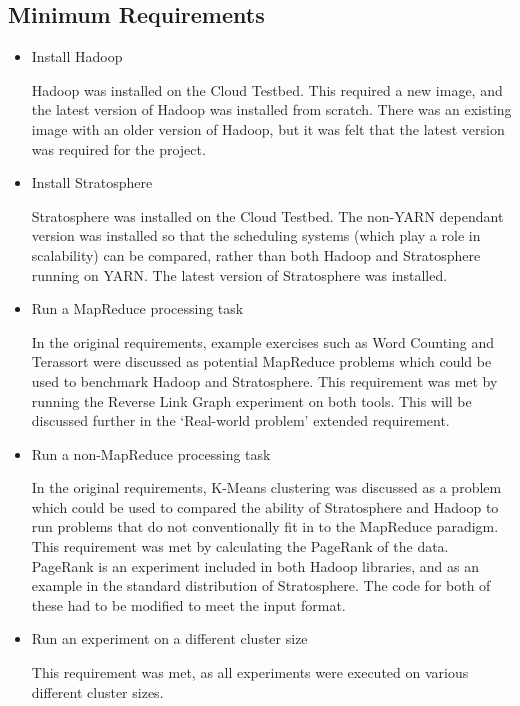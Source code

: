 \subsection{Minimum Requirements}
\begin{itemize}
	\item Install Hadoop

	Hadoop was installed on the Cloud Testbed. This required a new image, and the latest version of Hadoop was installed from scratch. There was an existing image with an older version of Hadoop, but it was felt that the latest version was required for the project.

	\item Install Stratosphere

	Stratosphere was installed on the Cloud Testbed. The non-YARN dependant version was installed so that the scheduling systems (which play a role in scalability) can be compared, rather than both Hadoop and Stratosphere running on YARN. The latest version of Stratosphere was installed.

	\item Run a MapReduce processing task

	In the original requirements, example exercises such as Word Counting and Terassort were discussed as potential MapReduce problems which could be used to benchmark Hadoop and Stratosphere. This requirement was met by running the Reverse Link Graph experiment on both tools. This will be discussed further in the `Real-world problem' extended requirement.

	\item Run a non-MapReduce processing task

	In the original requirements, K-Means clustering was discussed as a problem which could be used to compared the ability of Stratosphere and Hadoop to run problems that do not conventionally fit in to the MapReduce paradigm. This requirement was met by calculating the PageRank of the data. PageRank is an experiment included in both Hadoop libraries, and as an example in the standard distribution of Stratosphere. The code for both of these had to be modified to meet the input format.

	\item Run an experiment on a different cluster size

	This requirement was met, as all experiments were executed on various different cluster sizes.
\end{itemize}

